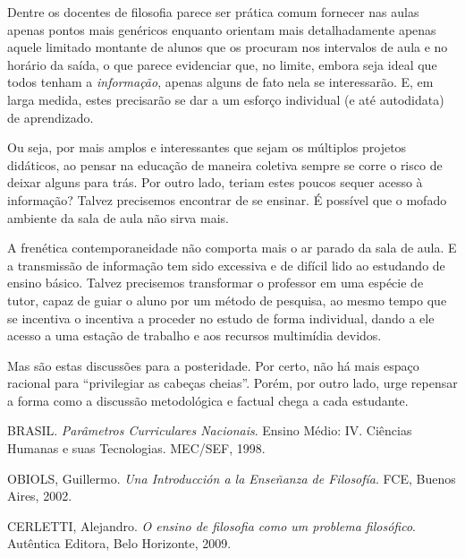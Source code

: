 \documentclass[12pt,a4paper]{article}
\begin{document}
	Dentre os docentes de filosofia parece ser prática comum fornecer 
	nas aulas apenas pontos mais genéricos enquanto orientam mais 
	detalhadamente apenas aquele limitado montante de alunos que os 
	procuram nos intervalos de aula e no horário da saída, o que 
	parece evidenciar que, no limite, embora seja ideal que todos 
	tenham a \emph{informação}, apenas alguns de fato nela se 
	interessarão. E, em larga medida, estes precisarão se dar a um 
	esforço individual (e até autodidata) de aprendizado. 

	Ou seja, por mais amplos e interessantes que sejam os múltiplos 
	projetos didáticos, ao pensar na educação de maneira coletiva 
	sempre se corre o risco de deixar alguns para trás. Por outro 
	lado, teriam estes poucos sequer acesso à informação? Talvez 
	precisemos encontrar de se ensinar. É possível que o mofado 
	ambiente da sala de aula não sirva mais. 

	A frenética contemporaneidade não comporta mais o ar parado da 
	sala de aula. E a transmissão de informação tem sido excessiva e 
	de difícil lido ao estudando de ensino básico. Talvez precisemos 
	transformar o professor em uma espécie de tutor, capaz de guiar 
	o aluno por um método de pesquisa, ao mesmo tempo que se incentiva 
	o incentiva a proceder no estudo de forma individual, dando a ele 
	acesso a uma estação de trabalho e aos recursos multimídia devidos. 

	Mas são estas discussões para a posteridade. Por certo, não há 
	mais espaço racional para “privilegiar as cabeças cheias”. Porém, 
	por outro lado, urge repensar a forma como a discussão metodológica 
	e factual chega a cada estudante. 

	\newpage
	
    \begin{thebibliography}{9}
		
		BRASIL. 
		\textit{Parâmetros Curriculares Nacionais}.  
		Ensino Médio: IV. Ciências Humanas e suas Tecnologias. 
		MEC/SEF, 1998. 
		
		OBIOLS, Guillermo. 
		\textit{Una Introducción a la Enseñanza de Filosofía}. 
		FCE, Buenos Aires, 2002. 
		
		CERLETTI, Alejandro. 
		\textit{O ensino de filosofia como um problema filosófico}. 
		Autêntica Editora, Belo Horizonte, 2009. 

	\end{thebibliography}
	
\end{document}
